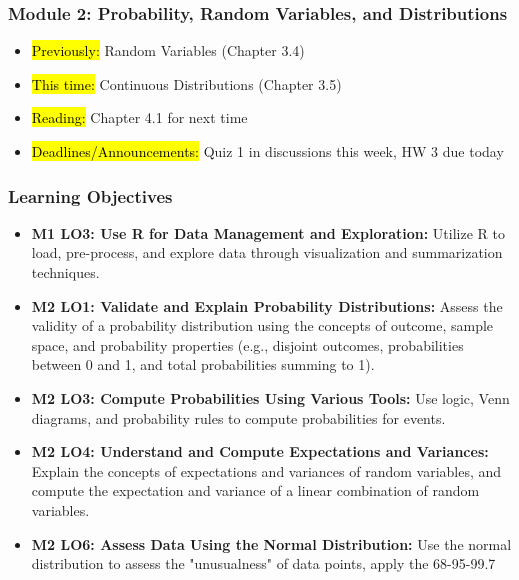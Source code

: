 
\begin{frame}
    \frametitle{Module 2: Probability, Random Variables, and Distributions}
    \begin{itemize}
        \item \hl{Previously: } Random Variables (Chapter 3.4)
        \item \hl{This time: } Continuous Distributions (Chapter 3.5)
        \item \hl{Reading: } Chapter 4.1 for next time
        \item \hl{Deadlines/Announcements: } Quiz 1 in discussions this week, HW 3 due today
    \end{itemize}
    
\end{frame}

\begin{frame}
    \frametitle{Learning Objectives}
    \begin{itemize}
        \item \textbf{M1 LO3: Use R for Data Management and Exploration:} Utilize R to load, pre-process, and explore data through visualization and summarization techniques.
        \item \textbf{M2 LO1: Validate and Explain Probability Distributions:} Assess the validity of a probability distribution using the concepts of outcome, sample space, and probability properties (e.g., disjoint outcomes, probabilities between 0 and 1, and total probabilities summing to 1).
        \item \textbf{M2 LO3: Compute Probabilities Using Various Tools:} Use logic, Venn diagrams, and probability rules to compute probabilities for events.
        \item \textbf{M2 LO4: Understand and Compute Expectations and Variances:} Explain the concepts of expectations and variances of random variables, and compute the expectation and variance of a linear combination of random variables.
        \item \textbf{M2 LO6: Assess Data Using the Normal Distribution:} Use the normal distribution to assess the "unusualness" of data points, apply the 68-95-99.7%
    \end{itemize}
\end{frame}

